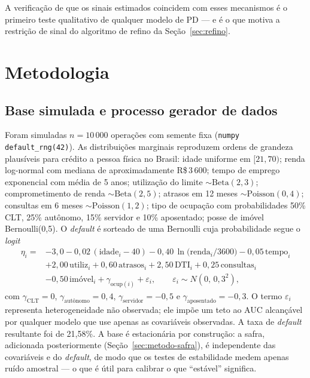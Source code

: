 \documentclass[11pt,a4paper]{article}
\newcommand{\code}[1]{\texttt{#1}}
\begin{document}
A verificação de que os sinais estimados coincidem com esses mecanismos é o primeiro teste qualitativo de qualquer modelo de PD --- e é o que motiva a restrição de sinal do algoritmo de refino da Seção~\ref{sec:refino}.

\section{Metodologia}
\label{sec:metodo}

\subsection{Base simulada e processo gerador de dados}
\label{sec:dgp}

Foram simuladas $n=10\,000$ operações com semente fixa (\code{numpy} \code{default\_rng(42)}). As distribuições marginais reproduzem ordens de grandeza plausíveis para crédito a pessoa física no Brasil: idade uniforme em $[21,70)$; renda log-normal com mediana de aproximadamente R\$\,3\,600; tempo de emprego exponencial com média de 5 anos; utilização do limite $\sim \mathrm{Beta}(2,3)$; comprometimento de renda $\sim \mathrm{Beta}(2,5)$; atrasos em 12 meses $\sim \mathrm{Poisson}(0{,}4)$; consultas em 6 meses $\sim \mathrm{Poisson}(1{,}2)$; tipo de ocupação com probabilidades 50\% CLT, 25\% autônomo, 15\% servidor e 10\% aposentado; posse de imóvel Bernoulli(0{,}5). O \emph{default} é sorteado de uma Bernoulli cuja probabilidade segue o \emph{logit}
\begin{equation}
\begin{aligned}
\eta_i ={}& -3{,}0 - 0{,}02\,(\text{idade}_i-40) - 0{,}40\,\ln\!\big(\text{renda}_i/3600\big) - 0{,}05\,\text{tempo}_i \\
&+ 2{,}00\,\text{utiliz}_i + 0{,}60\,\text{atrasos}_i + 2{,}50\,\text{DTI}_i + 0{,}25\,\text{consultas}_i \\
&- 0{,}50\,\text{imóvel}_i + \gamma_{\text{ocup}(i)} + \varepsilon_i,\qquad \varepsilon_i\sim N(0,\,0{,}3^2),
\end{aligned}
\label{eq:dgp}
\end{equation}
com $\gamma_{\text{CLT}}=0$, $\gamma_{\text{autônomo}}=0{,}4$, $\gamma_{\text{servidor}}=-0{,}5$ e $\gamma_{\text{aposentado}}=-0{,}3$. O termo $\varepsilon_i$ representa heterogeneidade não observada; ele impõe um teto ao AUC alcançável por qualquer modelo que use apenas as covariáveis observadas. A taxa de \emph{default} resultante foi de 21{,}58\%. A base é estacionária por construção: a safra, adicionada posteriormente (Seção~\ref{sec:metodo-safra}), é independente das covariáveis e do \emph{default}, de modo que os testes de estabilidade medem apenas ruído amostral --- o que é útil para calibrar o que ``estável'' significa.
\end{document}
